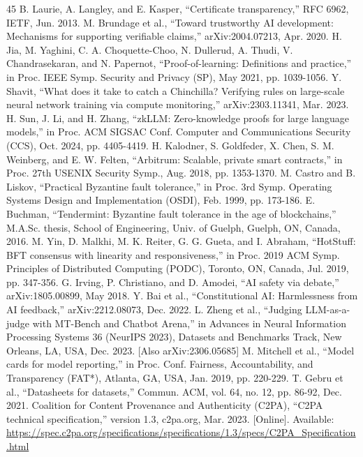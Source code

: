\documentclass[conference]{IEEEtran}
\begin{document}
\begin{thebibliography}{45}
 B. Laurie, A. Langley, and E. Kasper, ``Certificate transparency,'' RFC 6962, IETF, Jun. 2013.
 M. Brundage et al., ``Toward trustworthy AI development: Mechanisms for supporting verifiable claims,'' arXiv:2004.07213, Apr. 2020.
 H. Jia, M. Yaghini, C. A. Choquette-Choo, N. Dullerud, A. Thudi, V. Chandrasekaran, and N. Papernot, ``Proof-of-learning: Definitions and practice,'' in Proc. IEEE Symp. Security and Privacy (SP), May 2021, pp. 1039-1056.
 Y. Shavit, ``What does it take to catch a Chinchilla? Verifying rules on large-scale neural network training via compute monitoring,'' arXiv:2303.11341, Mar. 2023.
 H. Sun, J. Li, and H. Zhang, ``zkLLM: Zero-knowledge proofs for large language models,'' in Proc. ACM SIGSAC Conf. Computer and Communications Security (CCS), Oct. 2024, pp. 4405-4419.
 H. Kalodner, S. Goldfeder, X. Chen, S. M. Weinberg, and E. W. Felten, ``Arbitrum: Scalable, private smart contracts,'' in Proc. 27th USENIX Security Symp., Aug. 2018, pp. 1353-1370.
 M. Castro and B. Liskov, ``Practical Byzantine fault tolerance,'' in Proc. 3rd Symp. Operating Systems Design and Implementation (OSDI), Feb. 1999, pp. 173-186.
 E. Buchman, ``Tendermint: Byzantine fault tolerance in the age of blockchains,'' M.A.Sc. thesis, School of Engineering, Univ. of Guelph, Guelph, ON, Canada, 2016.
 M. Yin, D. Malkhi, M. K. Reiter, G. G. Gueta, and I. Abraham, ``HotStuff: BFT consensus with linearity and responsiveness,'' in Proc. 2019 ACM Symp. Principles of Distributed Computing (PODC), Toronto, ON, Canada, Jul. 2019, pp. 347-356.
 G. Irving, P. Christiano, and D. Amodei, ``AI safety via debate,'' arXiv:1805.00899, May 2018.
 Y. Bai et al., ``Constitutional AI: Harmlessness from AI feedback,'' arXiv:2212.08073, Dec. 2022.
 L. Zheng et al., ``Judging LLM-as-a-judge with MT-Bench and Chatbot Arena,'' in Advances in Neural Information Processing Systems 36 (NeurIPS 2023), Datasets and Benchmarks Track, New Orleans, LA, USA, Dec. 2023. [Also arXiv:2306.05685]
 M. Mitchell et al., ``Model cards for model reporting,'' in Proc. Conf. Fairness, Accountability, and Transparency (FAT*), Atlanta, GA, USA, Jan. 2019, pp. 220-229.
 T. Gebru et al., ``Datasheets for datasets,'' Commun. ACM, vol. 64, no. 12, pp. 86-92, Dec. 2021.
 Coalition for Content Provenance and Authenticity (C2PA), ``C2PA technical specification,'' version 1.3, c2pa.org, Mar. 2023. [Online]. Available: \url{https://spec.c2pa.org/specifications/specifications/1.3/specs/C2PA_Specification.html}

\end{thebibliography}
\end{document}
